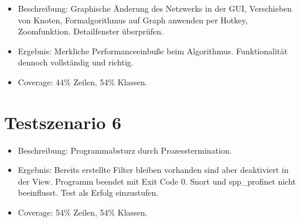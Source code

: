 \begin{itemize}
  \item Beschreibung: Graphische Änderung des Netzwerks in der GUI, Verschieben von Knoten, Formalgorithmus auf Graph anwenden per Hotkey, Zoomfunktion. Detailfenster überprüfen.
  \item Ergebnis: Merkliche Performanceeinbuße beim Algorithmus. Funktionalität dennoch vollständig und richtig.
  \item Coverage: 44\% Zeilen, 54\% Klassen.
\end{itemize}

\section{Testszenario 6}

\begin{itemize}
  \item Beschreibung: Programmabsturz durch Prozesstermination.
  \item Ergebnis: Bereits erstellte Filter bleiben vorhanden sind aber deaktiviert in der View. Programm beendet mit Exit Code 0. Snort und spp_profinet nicht beeinflusst. Test als Erfolg einzustufen.
  \item Coverage: 54\% Zeilen, 54\% Klassen.
\end{itemize}